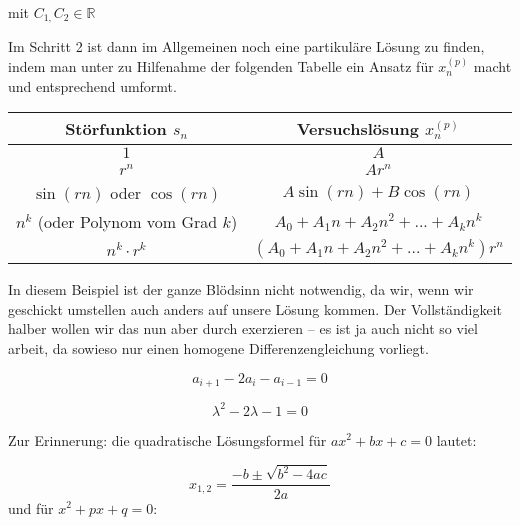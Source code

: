 \begin{uebsp}
\begin{Answer}



{
mit  $C_{1,}C_{2}\in \mathbb{R}$ }



{
Im Schritt 2 ist dann im Allgemeinen noch eine partikul\"are L\"osung zu
finden, indem man unter zu Hilfenahme der folgenden Tabelle ein Ansatz
f\"ur  $x_{n}^{(p)}$ macht und entsprechend umformt.}



\begin{center}
    \begin{tabular}{|c|c|}
        \hline
        Störfunktion $s_n$ & Versuchslösung $x_n^{(p)}$\\
        \hline
        $1$ & $A$\\
        $r^n$ & $Ar^n$\\
        $\sin(rn)$ oder $\cos(rn)$ & $A\sin(rn)+B\cos(rn)$\\
        $n^k$ (oder Polynom vom Grad $k$) & $A_0+A_1n+A_2n^2+...+A_kn^k$\\
        $n^k\cdot r^k$ & $(A_0+A_1n+A_2n^2+...+A_kn^k)r^n$\\
        \hline
    \end{tabular}
\end{center}
{
In diesem Beispiel ist der ganze Bl\"odsinn nicht notwendig, da wir,
wenn wir geschickt umstellen auch anders auf unsere L\"osung kommen.
Der Vollst\"andigkeit halber wollen wir das nun aber durch exerzieren
-- es ist ja auch nicht so viel arbeit, da sowieso nur einen homogene
Differenzengleichung vorliegt.}



\begin{equation*}
a_{i+1}-2a_{i}-a_{i-1}=0
\end{equation*}




\begin{equation*}
\lambda ^{2}-2\lambda -1=0
\end{equation*}


{
Zur Erinnerung: die quadratische L\"osungsformel f\"ur 
$\mathit{ax}^{2}+\mathit{bx}+c=0$ lautet:}



\begin{equation*}
x_{1,2}=\frac{-b\pm \sqrt{b^{2}-4\mathit{ac}}}{2a}
\end{equation*}
{
und f\"ur  $x^{2}+\mathit{px}+q=0$:}



\end{Answer}
\end{uebsp}
